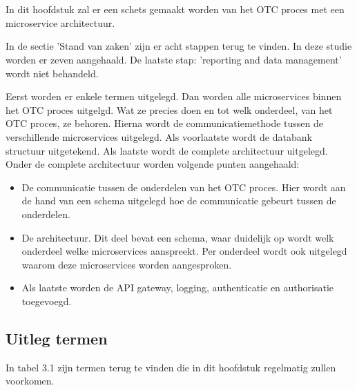 
\chapter{}
\label{ch:methodologie}

In dit hoofdstuk zal er een schets gemaakt worden van het OTC proces met een microservice architectuur. 

In de sectie 'Stand van zaken' zijn er acht stappen terug te vinden. In deze studie worden er zeven aangehaald. De laatste stap: 'reporting and data management' wordt niet behandeld.

Eerst worden er enkele termen uitgelegd. Dan worden alle microservices binnen het OTC proces uitgelgd. Wat ze precies doen en tot welk onderdeel, van het OTC proces, ze behoren. Hierna wordt de communicatiemethode tussen de verschillende microservices uitgelegd. Als voorlaatste wordt de databank structuur uitgetekend. Als laatste wordt de complete architectuur uitgelegd. Onder de complete architectuur worden volgende punten aangehaald:
\begin{itemize}
	\item De communicatie tussen de onderdelen van het OTC proces. Hier wordt aan de hand van een schema uitgelegd hoe de communicatie gebeurt tussen de onderdelen.
	\item De architectuur. Dit deel bevat een schema, waar duidelijk op wordt welk onderdeel welke microservices aanspreekt. Per onderdeel wordt ook uitgelegd waarom deze microservices worden aangesproken.
	\item Als laatste worden de API gateway, logging, authenticatie en authorisatie toegevoegd.
\end{itemize}

\section{Uitleg termen}
In tabel 3.1 zijn termen terug te vinden die in dit hoofdstuk regelmatig zullen voorkomen.

